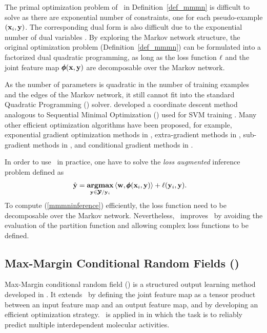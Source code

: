 {The primal optimization problem of \mmmn\ in Definition~\ref{def_mmmn} is difficult to solve as there are exponential number of constraints, one for each pseudo-example $(\mathbf {x}_i,\mathbf {y})$.
The corresponding dual form is also difficult due to the exponential number of dual variables \citep{Taskar04max}.
By exploring the Markov network structure, the original optimization problem (Definition~\ref{def_mmmn}) can be formulated into a factorized dual quadratic programming, as long as the loss function $\mathbf {\ell}$ and the joint feature map $\pmb \phi(\mathbf {x},\mathbf {y})$ are decomposable over the Markov network.

As the number of parameters is quadratic in the number of training examples and the edges of the Markov network, it still cannot fit into the standard Quadratic Programming (\qp) solver. 
\citet{Taskar04max} developed a coordinate descent method analogous to Sequential Minimal Optimization (\smo) used for SVM training \citep{Platt98sequential,Platt99fast}.
Many other efficient optimization algorithms have been proposed, for example, exponential gradient optimization methods in \citep{bartlett04}, extra-gradient methods in \citep{taskar06}, sub-gradient methods in \citet{Ratliff07}, and conditional gradient methods in \citep{Rousu06, Rousu07}.

In order to use \mmmn\ in practice, one have to solve the \textit{loss augmented} inference problem defined as
\begin{align}
	\hat{\mathbf {y}} = \underset{\mathbf {y}\in\pmb {\mathcal{Y}}/\mathbf {y}_i}{\textbf{argmax}} &\, \langle \mathbf {w}, \pmb \phi(\mathbf {x}_i,\mathbf {y}) \rangle + \mathbf {\ell}(\mathbf {y}_i,\mathbf {y}) \label{mmmninference}.
\end{align} 
To compute (\ref{mmmninference}) efficiently, the loss function need to be decomposable over the Markov network.
Nevertheless, \mmmn\ improves \crf\ by avoiding the evaluation of the partition function and allowing complex loss functions to be defined.



%
%
\subsection{Max-Margin Conditional Random Fields (\mmcrf)} \label{sc_mmcrf}

Max-Margin conditional random field (\mmcrf) is a structured output learning method developed in \citep{Rousu07}.
It extends \mmmn\ by defining the joint feature map as a tensor product between an input feature map and an output feature map, and by developing an efficient optimization strategy. 
\mmcrf\ is applied in  in which the task is to reliably predict multiple interdependent molecular activities.

}
